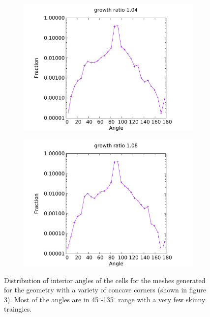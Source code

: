 \begin{figure}
	\centering
	\begin{subfigure}{0.5\textwidth}
		\centering
		\includegraphics[width=0.9\linewidth]{img/r/variousAngle-x0.5-g1.04/angleDistribution.pdf}
		\caption{}
		\label{fig-va-dist-low}
	\end{subfigure}%
	\begin{subfigure}{0.5\textwidth}
		\centering
		\includegraphics[width = 0.9\linewidth]{img/r/variousAngle-x0.3-g1.08/angleDistribution.pdf}
		\caption{}
		\label{fig-va-dist-high}
	\end{subfigure}
	\caption[Quality of EDAMSurf mesh generated for robustness test case 1.]{Distribution of interior angles of the cells for the meshes generated for the geometry with a variety of concave corners (shown in figure \ref{fig-variousAngle}). Most of the angles are in 45$^\circ$-135$^\circ$ range with a very few skinny traingles.}
	\label{fig-variousAngle}
\end{figure}

